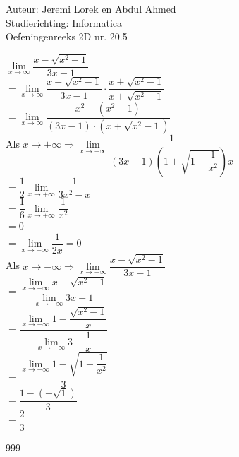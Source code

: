 \documentclass[a4paper]{article}
\begin{document}
  
\noindent \large Auteur: Jeremi Lorek en Abdul Ahmed \\
\noindent \large Studierichting:  Informatica\\
\noindent \large Oefeningenreeks 2D nr. 20.5\\

\medskip

\normalsize

 
$\lim\limits_{x \rightarrow \infty} \dfrac{x - \sqrt{x^2 - 1}}{3x - 1}$\\

$= \lim\limits_{x \rightarrow \infty} \dfrac{x - \sqrt{x^2 - 1}}{3x - 1} \cdot \dfrac{x + \sqrt{x^2 - 1}}{x + \sqrt{x^2 - 1}}$\\

$= \lim\limits_{x \rightarrow \infty} \dfrac{x^2 - (x^2 - 1)}{(3x - 1)\cdot (x + \sqrt{x^2 - 1})}$\\


Als $x \rightarrow +\infty \Rightarrow \lim\limits_{x \rightarrow +\infty} \dfrac{1}{(3x - 1) \left(1 + \sqrt{1 - \dfrac{1}{x^2}}\right)x}$\\

$=\dfrac{1}{2}\lim\limits_{x \rightarrow +\infty} \dfrac{1}{3x^2 - x} $\\

$=\dfrac{1}{6}\lim\limits_{x \rightarrow +\infty} \dfrac{1}{x^2} $\\

$=0 $\\


$= \lim\limits_{x \rightarrow +\infty} \dfrac{1}{2x} = 0$\\

Als $x \rightarrow -\infty \Rightarrow  \lim\limits_{x \rightarrow -\infty} \dfrac{x - \sqrt{x^2 - 1}}{3x - 1}$\\

$=\dfrac{\lim\limits_{x \rightarrow -\infty} x - \sqrt{x^2 - 1}}{\lim\limits_{x \rightarrow -\infty} 3x - 1}$\\

$=\dfrac{\lim\limits_{x \rightarrow -\infty} 1 - \dfrac{\sqrt{x^2 - 1}}{x}}{\lim\limits_{x \rightarrow -\infty} 3 - \dfrac{1}{x}}$\\

$=\dfrac{\lim\limits_{x \rightarrow -\infty} 1 - \sqrt{1 - \dfrac{1}{x^2}}}{3}$\\

$=\dfrac{1 - (-\sqrt{1})}{3}$\\

$=\dfrac{2}{3}$\\


\begin{thebibliography}{999}
\end{thebibliography}
\end{document}
